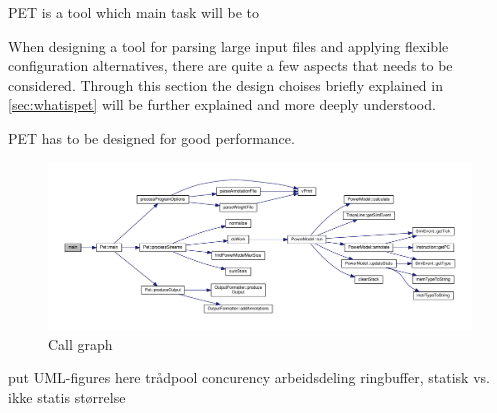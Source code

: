 PET is a tool which main task will be to 

When designing a tool for parsing large input files and applying flexible configuration alternatives,
there are quite a few aspects that needs to be considered. Through this section the design choises
briefly explained in \autoref{sec:whatispet} will be further explained and more deeply understood.

PET has to be designed for good performance.


\begin{figure}
%    
    \includegraphics[width=\textwidth]{figs/maincallgraph.pdf}
    \caption{Call graph}
    \label{fig:callgraph}
\end{figure}

put UML-figures here
trådpool
concurency
arbeidsdeling
ringbuffer, statisk vs. ikke statis størrelse




